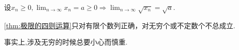 \begin{green}
    \begin{corollary}[开方运算]\label{cor:开方运算}
        设$\displaystyle x_n\geqslant 0,\lim_{n\to\infty}x_n=a\geqslant 0\Longrightarrow\lim_{n\to\infty}\sqrt{x_n}=\sqrt{a}.$
    \end{corollary}
\end{green}
\begin{red}
    \begin{remark}
        \cref{thm:极限的四则运算}只对有限个数列正确，对无穷个或不定数个不总成立.

        事实上,涉及无穷的时候总要小心而慎重.
    \end{remark}
\end{red}
